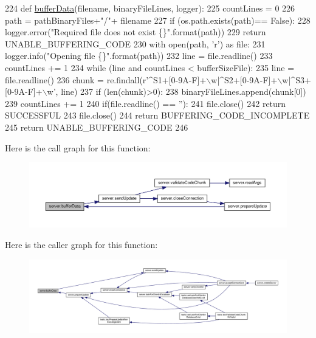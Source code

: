 \begin{DoxyCode}
224 \textcolor{keyword}{def }\hyperlink{namespaceserver_a6098d5cffff301a01e793c84215c4512}{bufferData}(filename, binaryFileLines, logger):
225      countLines = 0
226      path = pathBinaryFiles+\textcolor{stringliteral}{"/"}+ filename
227      \textcolor{keywordflow}{if} (os.path.exists(path)== \textcolor{keyword}{False}):
228           logger.error(\textcolor{stringliteral}{"Required file does not exist \{\}"}.format(path))
229           \textcolor{keywordflow}{return} UNABLE\_BUFFERING\_CODE
230      with open(path, \textcolor{stringliteral}{'r') as file:}
231 \textcolor{stringliteral}{          logger.info("Opening file \{\}"}.format(path))
232           line = file.readline()
233           countLines += 1
234           \textcolor{keywordflow}{while} (line \textcolor{keywordflow}{and} countLines < bufferSizeFile):
235                line = file.readline()
236                chunk = re.findall(\textcolor{stringliteral}{r'^S1+[0-9A-F]+\(\backslash\)w|^S2+[0-9A-F]+\(\backslash\)w|^S3+[0-9A-F]+\(\backslash\)w'}, line)
237                \textcolor{keywordflow}{if} (len(chunk)>0):
238                     binaryFileLines.append(chunk[0])
239                countLines += 1
240           if(file.readline() == \textcolor{stringliteral}{''}):
241                file.close()
242                \textcolor{keywordflow}{return} SUCCESSFUL
243           file.close()
244           \textcolor{keywordflow}{return} BUFFERING\_CODE\_INCOMPLETE
245      \textcolor{keywordflow}{return} UNABLE\_BUFFERING\_CODE
246 
\end{DoxyCode}
Here is the call graph for this function\+:
\nopagebreak
\begin{figure}[H]
\begin{center}
\leavevmode
\includegraphics[width=350pt]{namespaceserver_a6098d5cffff301a01e793c84215c4512_cgraph}
\end{center}
\end{figure}
Here is the caller graph for this function\+:
\nopagebreak
\begin{figure}[H]
\begin{center}
\leavevmode
\includegraphics[width=350pt]{namespaceserver_a6098d5cffff301a01e793c84215c4512_icgraph}
\end{center}
\end{figure}
\mbox{\label{namespaceserver_a2e99d18201fed087163454b021b7c007}} 
